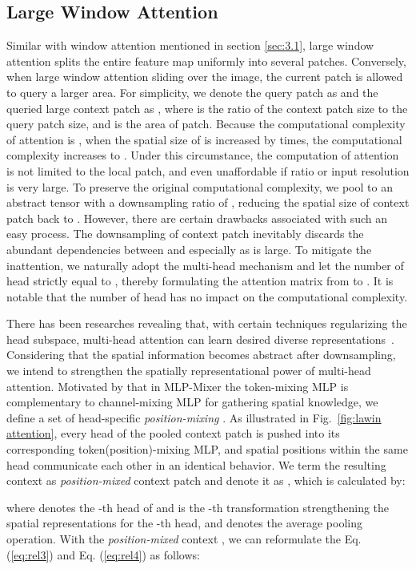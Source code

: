 \documentclass[10pt,twocolumn,letterpaper]{article}
\begin{document}
\subsection{Large Window Attention}
Similar with window attention mentioned in section \ref{sec:3.1}, large window attention splits the entire feature map uniformly into several patches. Conversely, when large window attention sliding over the image, the current patch is allowed to query a larger area. For simplicity, we denote the query patch as  and the queried large context patch as , where  is the ratio of the context patch size to the query patch size, and  is the area of patch. Because the computational complexity of attention is , when the spatial size of  is increased by  times, the computational complexity increases to . Under this circumstance, the computation of attention is not limited to the  local patch, and even unaffordable if ratio  or input resolution is very large. To preserve the original computational complexity, we pool  to an abstract tensor with a downsampling ratio of , reducing the spatial size of context patch back to . However, there are certain drawbacks associated with such an easy process. The downsampling of context patch inevitably discards the abundant dependencies between  and  especially as  is large. To mitigate the inattention, we naturally adopt the multi-head mechanism and let the number of head strictly equal to , thereby formulating the attention matrix from  to . It is notable that the number of head has no impact on the computational complexity.

There has been researches revealing that, with certain techniques regularizing the head subspace, multi-head attention can learn desired diverse representations~\cite{child2019generating, cordonnier2019relationship, d2021convit}. Considering that the spatial information becomes abstract after downsampling, we intend to strengthen the spatially representational power of multi-head attention. Motivated by that in MLP-Mixer the token-mixing MLP is complementary to channel-mixing MLP for gathering spatial knowledge, we define a set of head-specific \textit{position-mixing} . As illustrated in Fig.~\ref{fig:lawin attention}, every head of the pooled context patch is pushed into its corresponding token(position)-mixing MLP, and spatial positions within the same head communicate each other in an identical behavior. We term the resulting context as \textit{position-mixed} context patch and denote it as , which is calculated by:

where  denotes the -th head of  and  is the -th transformation strengthening the spatial representations for the -th head, and  denotes the average pooling operation. With the \textit{position-mixed} context , we can reformulate the Eq. (\ref{eq:rel3}) and Eq. (\ref{eq:rel4}) as follows:
\end{document}
